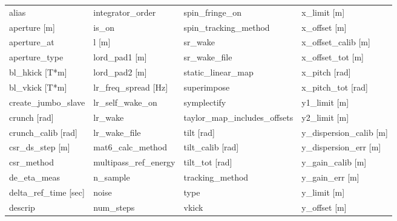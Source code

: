  \begin{tabular}{llll} \toprule
alias                            & integrator_order                 & spin_fringe_on                   & x_limit [m]                      \\
aperture [m]                     & is_on                            & spin_tracking_method             & x_offset [m]                     \\
aperture_at                      & l [m]                            & sr_wake                          & x_offset_calib [m]               \\
aperture_type                    & lord_pad1 [m]                    & sr_wake_file                     & x_offset_tot [m]                 \\
bl_hkick [T*m]                   & lord_pad2 [m]                    & static_linear_map                & x_pitch [rad]                    \\
bl_vkick [T*m]                   & lr_freq_spread [Hz]              & superimpose                      & x_pitch_tot [rad]                \\
create_jumbo_slave               & lr_self_wake_on                  & symplectify                      & y1_limit [m]                     \\
crunch [rad]                     & lr_wake                          & taylor_map_includes_offsets      & y2_limit [m]                     \\
crunch_calib [rad]               & lr_wake_file                     & tilt [rad]                       & y_dispersion_calib [m]           \\
csr_ds_step [m]                  & mat6_calc_method                 & tilt_calib [rad]                 & y_dispersion_err [m]             \\
csr_method                       & multipass_ref_energy             & tilt_tot [rad]                   & y_gain_calib [m]                 \\
de_eta_meas                      & n_sample                         & tracking_method                  & y_gain_err [m]                   \\
delta_ref_time [sec]             & noise                            & type                             & y_limit [m]                      \\
descrip                          & num_steps                        & vkick                            & y_offset [m]                     \\

\end{tabular}
